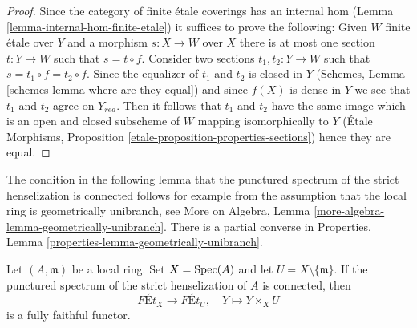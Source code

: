 \begin{proof}
Since the category of finite \'etale coverings has an
internal hom (Lemma \ref{lemma-internal-hom-finite-etale})
it suffices to prove the following: Given $W$ finite \'etale over $Y$
and a morphism $s : X \to W$ over $X$ there is at most one section
$t : Y \to W$ such that $s = t \circ f$. Consider two sections
$t_1, t_2 : Y \to W$ such that $s = t_1 \circ f = t_2 \circ f$.
Since the equalizer of $t_1$ and $t_2$ is closed in $Y$
(Schemes, Lemma \ref{schemes-lemma-where-are-they-equal})
and since $f(X)$ is dense in $Y$ we see that $t_1$ and $t_2$
agree on $Y_{red}$. Then it follows that $t_1$ and $t_2$ have
the same image which is an open and closed subscheme of $W$ mapping
isomorphically to $Y$
(\'Etale Morphisms, Proposition \ref{etale-proposition-properties-sections})
hence they are equal.
\end{proof}

\noindent
The condition in the following lemma that the punctured spectrum
of the strict henselization is connected follows for example from
the assumption that the local ring is geometrically unibranch, see
More on Algebra, Lemma \ref{more-algebra-lemma-geometrically-unibranch}.
There is a partial converse in
Properties, Lemma \ref{properties-lemma-geometrically-unibranch}.

\begin{lemma}
\label{lemma-same-etale-extensions}
Let $(A, \mathfrak m)$ be a local ring. Set $X = \mathop{\mathrm{Spec}}(A)$
and let $U = X \setminus \{\mathfrak m\}$. If the punctured spectrum
of the strict henselization of $A$ is connected, then
$$
\textit{F\'Et}_X \longrightarrow \textit{F\'Et}_U,\quad
Y \longmapsto Y \times_X U
$$
is a fully faithful functor.
\end{lemma}

